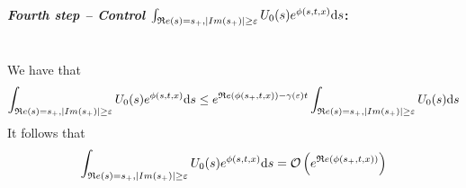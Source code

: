\documentclass[11pt]{amsart}
\renewcommand{\Re}{\mathfrak{R}e}
\begin{document}
\medskip
\paragraph{\textit{Fourth step -- Control $\int_{\Re(s) = s_+, |Im(s_+)| \geq \varepsilon} U_0(s) e^{\phi(s, t, x)} \ds$}:}\mbox{}\\
We have that 
\begin{align*}
    \int_{\Re(s) = s_+, |Im(s_+)| \geq \varepsilon} U_0(s) e^{\phi(s, t, x)}
    \ds 
    &\leq  e^{\Re(\phi(s_+, t, x)) - \gamma(\varepsilon)t} \int_{\Re(s) = s_+, |Im(s_+)| \geq \varepsilon} U_0(s) \ds \\
\end{align*}
It follows that 
\begin{align*}
    \int_{\Re(s) = s_+, |Im(s_+)| \geq \varepsilon} U_0(s) e^{\phi(s, t, x)} 
    \ds = \Ocal \left( e^{\Re(\phi(s_+, t, x))} \right)
\end{align*}





\end{document}

